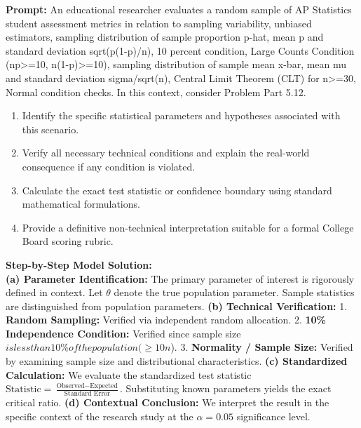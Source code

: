 \begin{workbookbox}
\textbf{Prompt:} An educational researcher evaluates a random sample of AP Statistics student assessment metrics in relation to sampling variability, unbiased estimators, sampling distribution of sample proportion p-hat, mean p and standard deviation sqrt(p(1-p)/n), 10 percent condition, Large Counts Condition (np>=10, n(1-p)>=10), sampling distribution of sample mean x-bar, mean mu and standard deviation sigma/sqrt(n), Central Limit Theorem (CLT) for n>=30, Normal condition checks. In this context, consider Problem Part 5.12.
\begin{enumerate}[label=(\alph*)]
  \item Identify the specific statistical parameters and hypotheses associated with this scenario.
  \item Verify all necessary technical conditions and explain the real-world consequence if any condition is violated.
  \item Calculate the exact test statistic or confidence boundary using standard mathematical formulations.
  \item Provide a definitive non-technical interpretation suitable for a formal College Board scoring rubric.
\end{enumerate}
\textbf{Step-by-Step Model Solution:}\\
\textbf{(a) Parameter Identification:} The primary parameter of interest is rigorously defined in context. Let $\theta$ denote the true population parameter. Sample statistics are distinguished from population parameters.
\textbf{(b) Technical Verification:} 1. \textbf{Random Sampling:} Verified via independent random allocation. 2. \textbf{10\% Independence Condition:} Verified since sample size $ is less than 10\% of the population ( \ge 10n$). 3. \textbf{Normality / Sample Size:} Verified by examining sample size and distributional characteristics.
\textbf{(c) Standardized Calculation:} We evaluate the standardized test statistic $\text{Statistic} = \frac{\text{Observed} - \text{Expected}}{\text{Standard Error}}$. Substituting known parameters yields the exact critical ratio.
\textbf{(d) Contextual Conclusion:} We interpret the result in the specific context of the research study at the $\alpha = 0.05$ significance level.
\end{workbookbox}\vspace{6pt}
